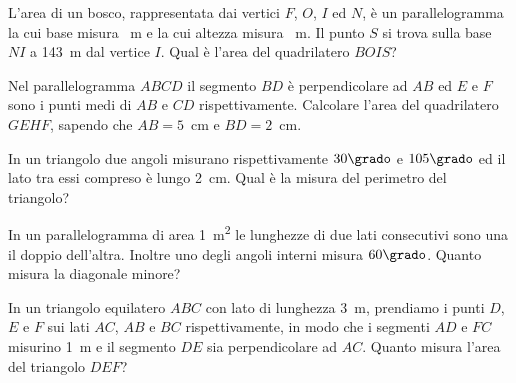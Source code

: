 \begin{multicols}{2}
\begin{esercizio}
\label{ese:7.108}
L'area di un bosco, rappresentata dai vertici \(F\), \(O\), \(I\) ed \(N\), è 
un parallelogramma la cui base misura ~m e la cui altezza 
misura ~m. Il punto \(S\) si trova sulla base \(NI\) a 143~m dal 
vertice \(I\). Qual è l'area del quadrilatero \(BOIS\)?
\end{esercizio}

%

\begin{esercizio}
\label{ese:7.109}
Nel parallelogramma \(ABCD\) il segmento \(BD\) è perpendicolare ad \(AB\) 
ed \(E\) e \(F\) sono i punti medi di \(AB\) e \(CD\) rispettivamente. 
Calcolare l'area del quadrilatero \(GEHF\), sapendo che \(AB=5\)~cm e 
\(BD=2\)~cm.
\end{esercizio}

%

\begin{esercizio}
\label{ese:7.110}
In un triangolo due angoli misurano rispettivamente \(30\grado\) e 
\(105\grado\) ed il lato tra essi compreso è lungo 2~cm. Qual è la 
misura del perimetro del triangolo? 
\end{esercizio}

\begin{esercizio}
\label{ese:7.111}
In un parallelogramma di area 1~m\textsuperscript{2} le lunghezze di 
due lati consecutivi sono una il doppio dell'altra. Inoltre uno degli 
angoli interni misura \(60\grado\). Quanto misura la diagonale minore?
\end{esercizio}

\begin{esercizio}
\label{ese:7.112}
In un triangolo equilatero \(ABC\) con lato di lunghezza 3~m, prendiamo 
i punti \(D\), \(E\) e \(F\) sui lati \(AC\), \(AB\) e \(BC\) rispettivamente, in 
modo che i segmenti \(AD\) e \(FC\) misurino 1~m e il segmento \(DE\) sia 
perpendicolare ad \(AC\). Quanto misura l'area del triangolo \(DEF\)?
\end{esercizio}


\end{multicols}
